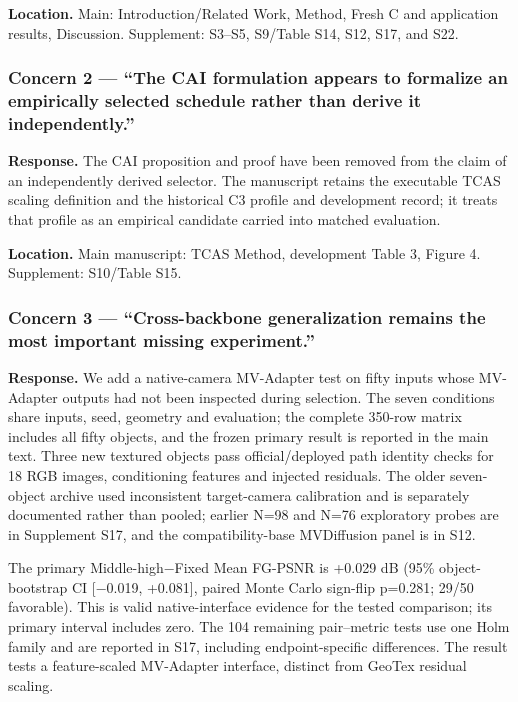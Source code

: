 \documentclass[
]{article}
\begin{document}
\textbf{Location.} Main: Introduction/Related Work, Method, Fresh C and
application results, Discussion. Supplement: S3--S5, S9/Table S14, S12,
S17, and S22.

\hypertarget{concern-2-the-cai-formulation-appears-to-formalize-an-empirically-selected-schedule-rather-than-derive-it-independently.}{%
\subsubsection{Concern 2 --- ``The CAI formulation appears to formalize
an empirically selected schedule rather than derive it
independently.''}\label{concern-2-the-cai-formulation-appears-to-formalize-an-empirically-selected-schedule-rather-than-derive-it-independently.}}

\textbf{Response.} The CAI proposition and proof have been removed from
the claim of an independently derived selector. The manuscript retains
the executable TCAS scaling definition and the historical C3 profile and
development record; it treats that profile as an empirical candidate
carried into matched evaluation.

\textbf{Location.} Main manuscript: TCAS Method, development Table 3,
Figure 4. Supplement: S10/Table S15.

\hypertarget{concern-3-cross-backbone-generalization-remains-the-most-important-missing-experiment.}{%
\subsubsection{Concern 3 --- ``Cross-backbone generalization remains the
most important missing
experiment.''}\label{concern-3-cross-backbone-generalization-remains-the-most-important-missing-experiment.}}

\textbf{Response.} We add a native-camera MV-Adapter test on fifty
inputs whose MV-Adapter outputs had not been inspected during selection.
The seven conditions share inputs, seed, geometry and evaluation; the
complete 350-row matrix includes all fifty objects, and the frozen
primary result is reported in the main text. Three new textured objects
pass official/deployed path identity checks for 18 RGB images,
conditioning features and injected residuals. The older seven-object
archive used inconsistent target-camera calibration and is separately
documented rather than pooled; earlier N=98 and N=76 exploratory probes
are in Supplement S17, and the compatibility-base MVDiffusion panel is
in S12.

The primary Middle-high−Fixed Mean FG-PSNR is +0.029 dB (95\%
object-bootstrap CI {[}−0.019, +0.081{]}, paired Monte Carlo sign-flip
p=0.281; 29/50 favorable). This is valid native-interface evidence for
the tested comparison; its primary interval includes zero. The 104
remaining pair--metric tests use one Holm family and are reported in
S17, including endpoint-specific differences. The result tests a
feature-scaled MV-Adapter interface, distinct from GeoTex residual
scaling.
\end{document}
